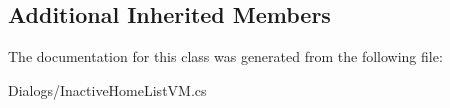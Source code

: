 \subsection*{Additional Inherited Members}


The documentation for this class was generated from the following file\+:\begin{DoxyCompactItemize}
\item 
Dialogs/Inactive\+Home\+List\+V\+M.\+cs\end{DoxyCompactItemize}
